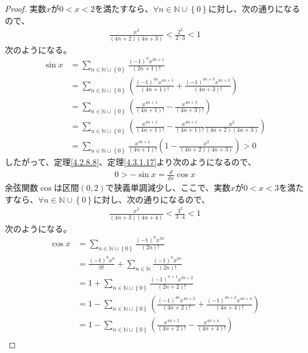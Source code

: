 \documentclass[dvipdfmx]{jsarticle}
\begin{document}
\begin{proof}
実数$x$が$0 < x < 2$を満たすなら、$\forall n \in \mathbb{N} \cup \left\{ 0 \right\}$に対し、次の通りになるので、
\begin{align*}
\frac{x^{2}}{(4n + 2)(4n + 3)} < \frac{2^{2}}{2 \cdot 3} < 1
\end{align*}
次のようになる。
\begin{align*}
\sin x &= \sum_{n \in \mathbb{N} \cup \left\{ 0 \right\}} \frac{( - 1)^{n}x^{2n + 1}}{(2n + 1)!}\\
&= \sum_{n \in \mathbb{N} \cup \left\{ 0 \right\}} \left( \frac{( - 1)^{4n}x^{4n + 1}}{(4n + 1)!} + \frac{( - 1)^{4n + 3}x^{4n + 3}}{(4n + 3)!} \right)\\
&= \sum_{n \in \mathbb{N} \cup \left\{ 0 \right\}} \left( \frac{x^{4n + 1}}{(4n + 1)!} - \frac{x^{4n + 3}}{(4n + 3)!} \right)\\
&= \sum_{n \in \mathbb{N} \cup \left\{ 0 \right\}} \left( \frac{x^{4n + 1}}{(4n + 1)!} - \frac{x^{4n + 1}}{(4n + 1)!}\frac{x^{2}}{(4n + 2)(4n + 3)} \right)\\
&= \sum_{n \in \mathbb{N} \cup \left\{ 0 \right\}} {\frac{x^{4n + 1}}{(4n + 1)!}\left( 1 - \frac{x^{2}}{(4n + 2)(4n + 3)} \right)} > 0
\end{align*}
したがって、定理\ref{4.2.8.8}、定理\ref{4.3.1.17}より次のようになるので、
\begin{align*}
0 > - \sin x = \frac{d}{dx}\cos x
\end{align*}
余弦関数$\cos$は区間$(0,2)$で狭義単調減少し、ここで、実数$x$が$0 < x < 3$を満たすなら、$\forall n \in \mathbb{N} \cup \left\{ 0 \right\}$に対し、次の通りになるので、
\begin{align*}
\frac{x^{2}}{(4n + 3)(4n + 4)} < \frac{3^{2}}{3 \cdot 4} < 1
\end{align*}
次のようになる。
\begin{align*}
\cos x &= \sum_{n \in \mathbb{N} \cup \left\{ 0 \right\}} \frac{( - 1)^{n}x^{2n}}{(2n)!}\\
&= \frac{( - 1)^{0}x^{0}}{0!} + \sum_{n \in \mathbb{N}} \frac{( - 1)^{n}x^{2n}}{(2n)!}\\
&= 1 + \sum_{n \in \mathbb{N} \cup \left\{ 0 \right\}} \frac{( - 1)^{n + 1}x^{2n + 2}}{(2n + 2)!}\\
&= 1 - \sum_{n \in \mathbb{N} \cup \left\{ 0 \right\}} \left( \frac{( - 1)^{4n}x^{4n + 2}}{(4n + 2)!} + \frac{( - 1)^{4n + 2}x^{4n + 4}}{(4n + 4)!} \right)\\
&= 1 - \sum_{n \in \mathbb{N} \cup \left\{ 0 \right\}} \left( \frac{x^{4n + 2}}{(4n + 2)!} - \frac{x^{4n + 4}}{(4n + 4)!} \right)\\

\end{align*}
\end{proof}
\end{document}
